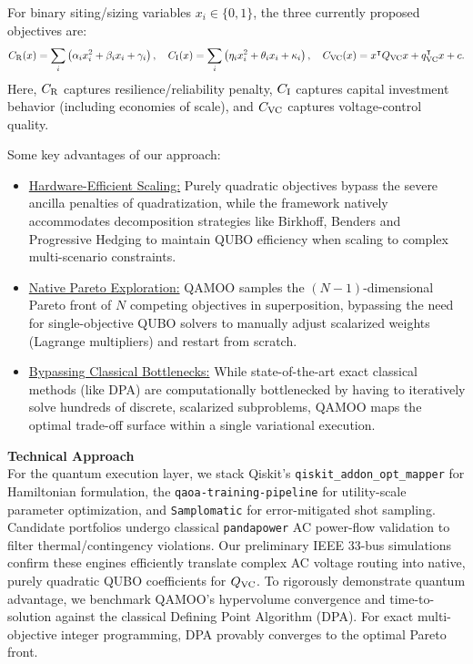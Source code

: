 \documentclass[11pt]{article}
\begin{document}
For binary siting/sizing variables $x_i\in\{0,1\}$, the three currently proposed objectives are:
$$
C_{\rm R}(x) = \sum_i \left(\alpha_i x_i^2 + \beta_i x_i + \gamma_i\right),\quad
C_{\rm I}(x) = \sum_i \left(\eta_i x_i^2 + \theta_i x_i + \kappa_i\right),\quad
C_{\rm VC}(x) = x^{\intercal}Q_{\rm VC}x + q_{\rm VC}^{\intercal}x + c.
$$
Here, $C_{\rm R}$ captures resilience/reliability penalty, $C_{\rm I}$ captures capital investment behavior (including economies of scale), and $C_{\rm VC}$ captures voltage-control quality.

Some key advantages of our approach:
\begin{itemize}[leftmargin=*, itemsep=0pt, topsep=0pt, parsep=0pt, partopsep=0pt]
  \item \underline{Hardware-Efficient Scaling:} Purely quadratic objectives bypass the severe ancilla penalties of quadratization, while the framework natively accommodates decomposition strategies like Birkhoff, Benders and Progressive Hedging to maintain QUBO efficiency when scaling to complex multi-scenario constraints.
  \item \underline{Native Pareto Exploration:} QAMOO samples the $(N-1)$-dimensional Pareto front of $N$ competing objectives in superposition, bypassing the need for single-objective QUBO solvers to manually adjust scalarized weights (Lagrange multipliers) and restart from scratch.
  \item \underline{Bypassing Classical Bottlenecks:} While state-of-the-art exact classical methods (like DPA) are computationally bottlenecked by having to iteratively solve hundreds of discrete, scalarized subproblems, QAMOO maps the optimal trade-off surface within a single variational execution.
\end{itemize}

\noindent\textbf{Technical Approach}\\
For the quantum execution layer, we stack Qiskit's \verb|qiskit_addon_opt_mapper| for Hamiltonian formulation, the \verb|qaoa-training-pipeline| for utility-scale parameter optimization, and \verb|Samplomatic| for error-mitigated shot sampling. Candidate portfolios undergo classical \verb|pandapower| AC power-flow validation to filter thermal/contingency violations. Our preliminary IEEE 33-bus simulations confirm these engines efficiently translate complex AC voltage routing into native, purely quadratic QUBO coefficients for $Q_{\rm VC}$. To rigorously demonstrate quantum advantage, we benchmark QAMOO's hypervolume convergence and time-to-solution against the classical Defining Point Algorithm (DPA). For exact multi-objective integer programming, DPA provably converges to the optimal Pareto front.
\end{document}
